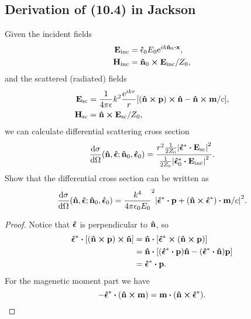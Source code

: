 \documentclass[10pt]{article}
\begin{document}
\subsection{Derivation of (10.4) in Jackson}
Given the incident fields
\begin{align*}
	\vb{E}_{\mathrm{inc}} &= \vu{\epsilon}_0 E_0 \e^{i k \vu{n}_0\vdot \vb{x}}, \\
	\vb{H}_{\mathrm{inc}} &= \vu{n}_0 \cross \vb{E}_{\mathrm{inc}} / Z_0,
\end{align*}
and the scattered (radiated) fields
\begin{align*}
	\vb{E}_{\mathrm{sc}} &= \frac{1}{4 \pi \epsilon} k^2 \frac{{\mathrm{e}}^{ikr}}{r} [(\vu{n} \cross \vb{p}) \cross \vu{n} - \vu{n} \cross \vb{m} / c], \\
	\vb{H}_{\mathrm{sc}} &= \vu{n} \cross \vb{E}_{\mathrm{sc}} / Z_0,
\end{align*}
we can calculate differential scattering cross section
\begin{equation}
	\frac{\dd{\sigma}}{\dd{\Omega}}(\vu{n}, \vu*{\epsilon}; \vu{n}_0, \vu*{\epsilon}_0) = \frac{r^2 \frac{1}{2Z_0} \abs{\vu*{\epsilon}^* \vdot \vb{E}_{\mathrm{sc}}}^2}{\frac{1}{2Z_0} \abs{\vu*{\epsilon}_0^* \vdot \vb{E}_{\mathrm{inc}}}^2}.
\end{equation}
Show that the differential cross section can be written as
\begin{equation}
	\frac{\dd{\sigma}}{\dd{\Omega}}(\vu{n}, \vu*{\epsilon}; \vu{n}_0, \vu*{\epsilon}_0) =
	\frac{k^4}{4\pi \epsilon_0 E_0}^2 \abs{\vu*{\epsilon}^* \vdot \vb{p} + (\vu{n} \cross \vu*{\epsilon}^*) \vdot \vb{m}/c}^2.
\end{equation}
\begin{proof}
	Notice that $\vu*{\epsilon}$ is perpendicular to $\vu{n}$, so
	\begin{align*}
		\vu*{\epsilon}^* \vdot [(\vu{n} \cross \vb{p}) \cross \vu{n}] &= \vu{n} \vdot [\vu*{\epsilon}^* \cross (\vu{n} \cross \vb{p})] \\
		&= \vu{n} \vdot [(\vu*{\epsilon}^* \vdot \vb{p}) \vu{n} - (\vu*{\epsilon}^* \vdot \vu{n}) \vb{p}] \\
		&= \vu*{\epsilon}^* \vdot \vb{p}.
	\end{align*}
	For the magenetic moment part we have
	\begin{equation}
		- \vu*{\epsilon}^* \vdot (\vu{n} \cross \vb{m}) = \vb{m} \vdot (\vu{n} \cross \vu*{\epsilon}^*).
	\end{equation}
\end{proof}
\end{document}
